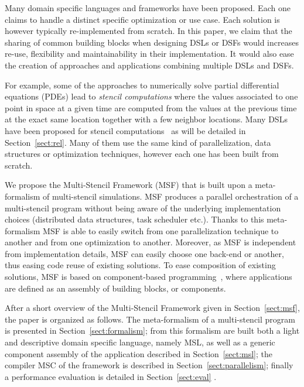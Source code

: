 Many domain specific languages and frameworks have been proposed. Each one claims to handle a distinct specific optimization or use case.
Each solution is however typically re-implemented from scratch.
In this paper, we claim that the sharing of common building blocks when designing DSLs or DSFs would increases re-use, flexibility and maintainability in their implementation.
It would also ease the creation of approaches and applications combining multiple DSLs and DSFs.

For example, some of the approaches to numerically solve partial differential equations (PDEs) lead to \emph{stencil computations} where the values associated to one point in space at a given time are computed from the values at the previous time at the exact same location together with a few neighbor locations.
Many DSLs have been proposed for stencil computations~\cite{spaaTangCKLL11,citeulike12258902,Ragan-Kelley:2013:HLC:2491956.2462176,DeVito:2011:LDS:2063384.2063396,Camier:2015:IPP:2820083.2820107} as will be detailed in Section~\ref{sect:rel}.
Many of them use the same kind of parallelization, data structures or optimization techniques, however each one has been built from scratch. 

We propose the Multi-Stencil Framework (MSF) that is built upon a meta-formalism of multi-stencil simulations. MSF produces a parallel orchestration of a multi-stencil program without being aware of the underlying implementation choices (\eg distributed data structures, task scheduler etc.). Thanks to this meta-formalism MSF is able to easily switch from one parallelization technique to another and from one optimization to another. Moreover, as MSF is independent from implementation details, MSF can easily choose one back-end or another, thus easing code reuse of existing solutions.
To ease composition of existing solutions, MSF is based on component-based programming~\cite{Szyperski:2002:CSB:515228}, where applications are defined as an assembly of building blocks, or components.

After a short overview of the Multi-Stencil Framework given in Section~\ref{sect:msf}, the paper is organized as follows. The meta-formalism of a multi-stencil program is presented in Section~\ref{sect:formalism}; from this formalism are built both a light and descriptive domain specific language, namely MSL, as well as a generic component assembly of the application described in Section~\ref{sect:msl}; the compiler MSC of the framework is described in Section~\ref{sect:parallelism}; finally a performance evaluation is detailed in Section~\ref{sect:eval} .

